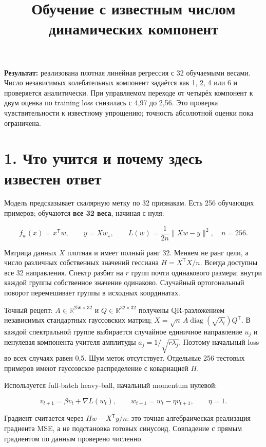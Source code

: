 \documentclass[10pt,a4paper]{article}
\author{}\date{}
\title{Обучение с известным числом динамических компонент}
\begin{document}
\maketitle

\textbf{Результат:} реализована плотная линейная регрессия с 32 обучаемыми весами. Число независимых колебательных компонент задаётся как 1, 2, 4 или 6 и проверяется аналитически. При управляемом переходе от четырёх компонент к двум оценка по training loss снизилась с 4,97 до 2,56. Это проверка чувствительности к известному упрощению; точность абсолютной оценки пока ограничена.

\section*{1. Что учится и почему здесь известен ответ}

Модель предсказывает скалярную метку по 32 признакам. Есть 256 обучающих примеров; обучаются \textbf{все 32 веса}, начиная с нуля:

\[
f_w(x)=x^{\mathsf T}w,\qquad y=Xw_\star,\qquad L(w)=\frac{1}{2n}\|Xw-y\|^2,\quad n=256.
\]

Матрица данных $X$ плотная и имеет полный ранг 32. Меняем не ранг цели, а число различных собственных значений гессиана $H=X^{\mathsf T}X/n$. Всегда доступны все 32 направления. Спектр разбит на $r$ групп почти одинакового размера; внутри каждой группы собственное значение одинаково. Случайный ортогональный поворот перемешивает группы в исходных координатах.

Точный рецепт: $A\in\mathbb R^{256\times32}$ и $Q\in\mathbb R^{32\times32}$ получены QR-разложением независимых стандартных гауссовских матриц; $X=\sqrt n\,A\operatorname{diag}(\sqrt{\lambda_i})Q^{\mathsf T}$. В каждой спектральной группе выбирается случайное единичное направление $u_j$ и ненулевая компонента учителя амплитуды $a_j=1/\sqrt{r\lambda_j}$. Поэтому начальный loss во всех случаях равен 0,5. Шум меток отсутствует. Отдельные 256 тестовых примеров имеют гауссовское распределение с ковариацией $H$.

Используется full-batch heavy-ball, начальный momentum нулевой:

\[
v_{t+1}=\beta v_t+\nabla L(w_t),\qquad w_{t+1}=w_t-\eta v_{t+1},\qquad \eta=1.
\]

Градиент считается через $Hw-X^{\mathsf T}y/n$: это точная алгебраическая реализация градиента MSE, а не подстановка готовых синусоид. Совпадение с прямым градиентом по данным проверено численно.
\end{document}
